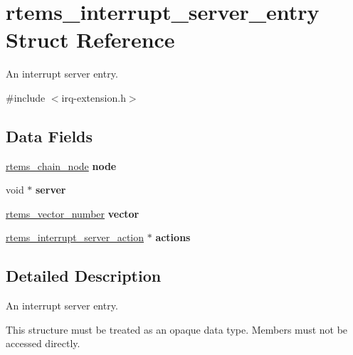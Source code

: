 \hypertarget{structrtems__interrupt__server__entry}{}\section{rtems\+\_\+interrupt\+\_\+server\+\_\+entry Struct Reference}
\label{structrtems__interrupt__server__entry}


An interrupt server entry.  




{\ttfamily \#include $<$irq-\/extension.\+h$>$}

\subsection*{Data Fields}
\begin{DoxyCompactItemize}
\item 
\mbox{\label{structrtems__interrupt__server__entry_a9d8291a0b14395dc16cf2f7c095935b7}} 
\mbox{\hyperlink{structChain__Node__struct}{rtems\+\_\+chain\+\_\+node}} {\bfseries node}
\item 
\mbox{\label{structrtems__interrupt__server__entry_a0352b7b6c2e7e84d725b47d323418a24}} 
void $\ast$ {\bfseries server}
\item 
\mbox{\label{structrtems__interrupt__server__entry_ace7a76c3eb87970bd00f18ad9c796ea3}} 
\mbox{\hyperlink{group__ClassicINTR_ga3e434c197d99f128e78cae4d9358bd8b}{rtems\+\_\+vector\+\_\+number}} {\bfseries vector}
\item 
\mbox{\label{structrtems__interrupt__server__entry_aa8db6b2179f0cd585756c884613bbe75}} 
\mbox{\hyperlink{structrtems__interrupt__server__action}{rtems\+\_\+interrupt\+\_\+server\+\_\+action}} $\ast$ {\bfseries actions}
\end{DoxyCompactItemize}


\subsection{Detailed Description}
An interrupt server entry. 

This structure must be treated as an opaque data type. Members must not be accessed directly.

